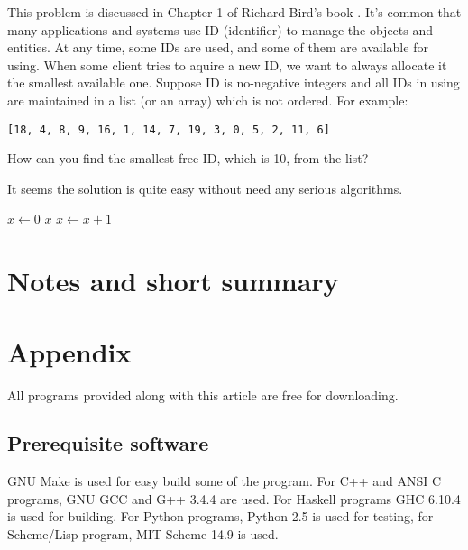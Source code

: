\documentclass{article}
\begin{document}
This problem is discussed in Chapter 1 of Richard Bird's book \cite{Bird-book}. It's common that many applications and systems use ID (identifier)
to manage the objects and entities. At any time, some IDs are used, and
some of them are available for using. When some client tries to aquire
a new ID, we want to always allocate it the smallest available one.
Suppose ID is no-negative integers and all IDs in using are maintained 
in a list (or an array) which is not ordered. For example:

\begin{verbatim}
[18, 4, 8, 9, 16, 1, 14, 7, 19, 3, 0, 5, 2, 11, 6]
\end{verbatim}

How can you find the smallest free ID, which is 10, from the list?

It seems the solution is quite easy without need any serious algorithms.

\begin{algorithmic}[1]
  \State $x \gets 0$
  \Loop
      \State \Return $x$
    \Else
      \State $x \gets x + 1$
    \EndIf
  \EndLoop
\EndFunction
\end{algorithmic}

\section{Notes and short summary}

\section{Appendix} \label{appendix}
All programs provided along with this article are free for
downloading.

\subsection{Prerequisite software}
GNU Make is used for easy build some of the program. For C++ and ANSI C programs,
GNU GCC and G++ 3.4.4 are used. 
For Haskell programs GHC 6.10.4 is used
for building. For Python programs, Python 2.5 is used for testing, for
Scheme/Lisp program, MIT Scheme 14.9 is used.
\end{document}
